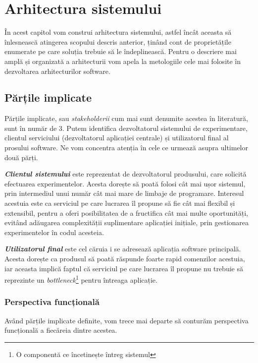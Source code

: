 \chapter{Arhitectura sistemului}

În acest capitol vom construi arhitectura sistemului, astfel încât aceasta să înlesnească atingerea scopului descris anterior, ținând cont de proprietățile enumerate pe care soluția trebuie să le îndeplinească. Pentru o descriere mai amplă și organizată a arhitecturii vom apela la metologiile cele mai folosite în dezvoltarea arhitecturilor software. \cite{architecture}

\section{Părțile implicate}

Părțile implicate, sau \textit{stakeholderii} cum mai sunt denumite acestea în literatură, sunt în număr de 3. Putem identifica dezvoltatorul sistemului de experimentare, clientul serviciului (dezvoltatorul aplicației centrale) și utilizatorul final al prosului software. Ne vom concentra atenția în cele ce urmează asupra ultimelor două părți.

\textbf{\textit{Clientul sistemului}} este reprezentat de dezvoltatorul produsului, care solicită efectuarea experimentelor. Acesta dorește să poată folosi cât mai ușor sistemul, prin intermediul unui număr cât mai mare de limbaje de programare. Interesul acestuia este ca serviciul pe care lucrarea îl propune să fie cât mai flexibil și extensibil, pentru a oferi posibilitatea de a fructifica cât mai multe oportunități, evitând adăugarea complexității suplimentare aplicației inițiale, prin gestionarea experimentelor în codul acesteia.

\textbf{\textit{Utilizatorul final}} este cel căruia i se adresează aplicația software principală. Acesta dorește ca produsul să poată răspunde foarte rapid comenzilor acestuia, iar aceasta implică faptul că serviciul pe care lucrarea îl propune nu trebuie să reprezinte un \textit{bottleneck}\footnote{O componentă ce încetinește întreg sistemul} pentru întreaga aplicație.

\subsection{Perspectiva funcțională}

Având părțile implicate definite, vom trece mai departe să conturăm perspectiva funcțională a fiecăreia dintre acestea.

